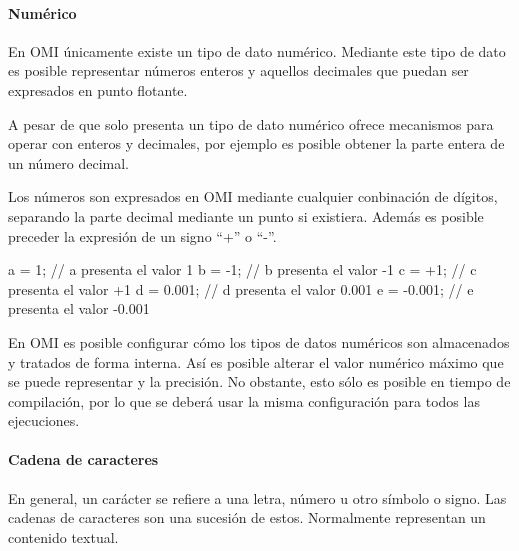 \paragraph{Numérico}\label{sec:type_num}
En OMI únicamente existe un tipo de dato numérico. Mediante este tipo de dato es posible representar 
números enteros y aquellos decimales que puedan ser expresados en punto flotante. 

A pesar de que solo presenta un tipo de dato numérico ofrece mecanismos para operar con enteros y decimales, por ejemplo es posible obtener la parte entera de 
un número decimal.

Los números son expresados en OMI mediante cualquier conbinación de dígitos, separando la parte decimal mediante un punto si existiera. Además es
posible preceder la expresión de un signo ``+'' o ``-''. \\

\begin{myverbatim}
   a = 1; // a presenta el valor 1
   b = -1; // b presenta el valor -1
   c = +1; // c presenta el valor +1
   d = 0.001; // d presenta el valor 0.001
   e = -0.001; // e presenta el valor -0.001
\end{myverbatim}

En OMI es posible configurar cómo los tipos de datos numéricos son almacenados y tratados de forma interna. Así es posible alterar el valor numérico máximo que se puede representar 
y la precisión. No obstante, esto sólo es posible en tiempo de compilación, por lo que se deberá usar la misma configuración para todos las ejecuciones. \\


\paragraph{Cadena de caracteres}\label{sec:type_string}
En general, un carácter se refiere a una letra, número u otro símbolo o signo. Las cadenas de caracteres son una sucesión de estos. Normalmente representan un contenido textual. 

